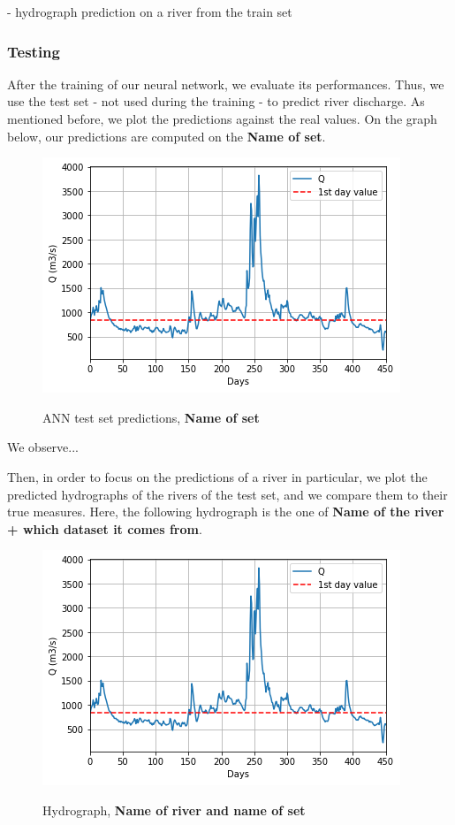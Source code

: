 - hydrograph prediction on a river from the train set \\


\subsubsection{Testing}

After the training of our neural network, we evaluate its performances. Thus, we use the test set - not used during the training - to predict river discharge. As mentioned before, we plot the predictions against the real values. On the graph below, our predictions are computed on the \textbf{Name of set}.

\begin{figure}[H]
    \centering
    \includegraphics[scale = 0.5]{Graph/1year.png}
    \label{fig:my_label}
    \caption{ANN test set predictions, \textbf{Name of set}}
\end{figure}

We observe...

Then, in order to focus on the predictions of a river in particular, we plot the predicted hydrographs of the rivers of the test set, and we compare them to their true measures. Here, the following hydrograph is the one of \textbf{Name of the river + which dataset it comes from}.

\begin{figure}[H]
    \centering
    \includegraphics[scale = 0.5]{Graph/1year.png}
    \label{fig:my_label}
    \caption{Hydrograph, \textbf{Name of river and name of set}}
\end{figure}

